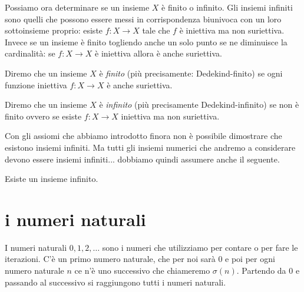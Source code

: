 Possiamo ora determinare se un insieme $X$ è finito o infinito.
Gli insiemi infiniti sono quelli che possono essere messi in corrispondenza 
biunivoca con un loro sottoinsieme proprio: esiste $f\colon X\to X$ 
tale che $f$ è iniettiva ma non suriettiva. 
Invece se un insieme è finito togliendo anche un solo punto
se ne diminuisce la cardinalità: se $f\colon X\to X$ è iniettiva
allora è anche suriettiva.

\begin{definition}[infinito]
  \label{def:infinito}%
  Diremo che un insieme $X$ è \emph{finito}
  (più precisamente: Dedekind-finito)
  se ogni funzione iniettiva $f\colon X\to X$ è anche suriettiva.
%

  Diremo che un insieme $X$ è \emph{infinito} 
  (più precisamente Dedekind-infinito)
  se non è finito ovvero
  se esiste $f\colon X\to X$ iniettiva ma non suriettiva.
%
\end{definition}

Con gli assiomi che abbiamo introdotto finora non è possibile dimostrare 
che esistono insiemi infiniti. 
Ma tutti gli insiemi numerici che andremo a considerare devono essere 
insiemi infiniti... dobbiamo quindi assumere anche il seguente. 

\begin{axiom}[infinito]
  \label{axiom:infinito}%
  Esiste un insieme infinito. 
\end{axiom}


\section{i numeri naturali}

I numeri naturali $0,1,2,\dots$ sono i numeri che utilizziamo per contare o per 
fare le iterazioni. C'è un primo numero naturale, che per noi sarà $0$ e poi
per ogni numero naturale $n$ ce n'è uno successivo che chiameremo $\sigma(n)$. 
Partendo da $0$ e passando al successivo si raggiungono tutti i numeri naturali.

